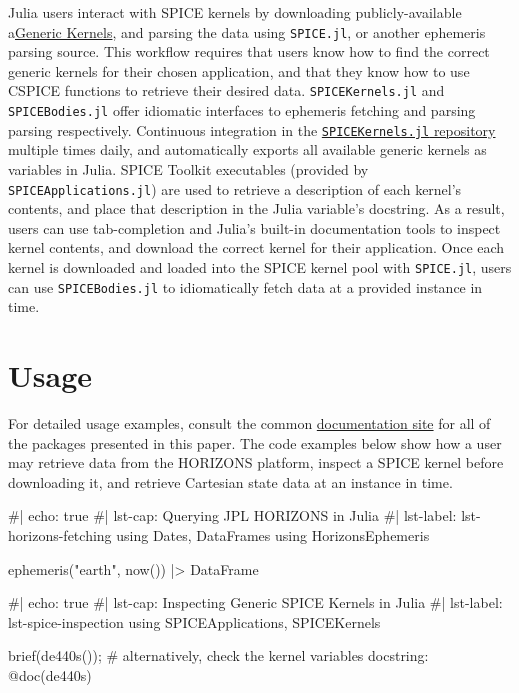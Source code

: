 \documentclass[
]{article}
\newenvironment{Shaded}{\begin{snugshade}}{\end{snugshade}}
\newcommand{\NormalTok}[1]{\textcolor[rgb]{0.00,0.23,0.31}{#1}}
\begin{document}
Julia users interact with SPICE kernels by downloading
publicly-available
a\href{https://naif.jpl.nasa.gov/pub/naif/generic_kernels/}{Generic
Kernels}, and parsing the data using \texttt{SPICE.jl}, or another
ephemeris parsing source. This workflow requires that users know how to
find the correct generic kernels for their chosen application, and that
they know how to use CSPICE functions to retrieve their desired data.
\texttt{SPICEKernels.jl} and \texttt{SPICEBodies.jl} offer idiomatic
interfaces to ephemeris fetching and parsing parsing respectively.
Continuous integration in the
\href{https://github.com/cadojo/SPICEKernels.jl}{\texttt{SPICEKernels.jl}
repository} multiple times daily, and automatically exports all
available generic kernels as variables in Julia. SPICE Toolkit
executables (provided by \texttt{SPICEApplications.jl}) are used to
retrieve a description of each kernel's contents, and place that
description in the Julia variable's docstring. As a result, users can
use tab-completion and Julia's built-in documentation tools to inspect
kernel contents, and download the correct kernel for their application.
Once each kernel is downloaded and loaded into the SPICE kernel pool
with \texttt{SPICE.jl}, users can use \texttt{SPICEBodies.jl} to
idiomatically fetch data at a provided instance in time.

\section{Usage}\label{sec-usage}

For detailed usage examples, consult the common
\href{https://ephemeris.loopy.codes}{documentation site} for all of the
packages presented in this paper. The code examples below show how a
user may retrieve data from the HORIZONS platform, inspect a SPICE
kernel before downloading it, and retrieve Cartesian state data at an
instance in time.

\begin{Shaded}
\begin{Highlighting}[]
\NormalTok{\#| echo: true}
\NormalTok{\#| lst{-}cap: Querying JPL HORIZONS in Julia }
\NormalTok{\#| lst{-}label: lst{-}horizons{-}fetching}
\NormalTok{using Dates, DataFrames}
\NormalTok{using HorizonsEphemeris}

\NormalTok{ephemeris("earth", now()) |\textgreater{} DataFrame}
\end{Highlighting}
\end{Shaded}

\begin{Shaded}
\begin{Highlighting}[]
\NormalTok{\#| echo: true}
\NormalTok{\#| lst{-}cap: Inspecting Generic SPICE Kernels in Julia}
\NormalTok{\#| lst{-}label: lst{-}spice{-}inspection}
\NormalTok{using SPICEApplications, SPICEKernels}

\NormalTok{brief(de440s()); \# alternatively, check the kernel variable\textquotesingle{}s docstring: @doc(de440s)}
\end{Highlighting}
\end{Shaded}
\end{document}
